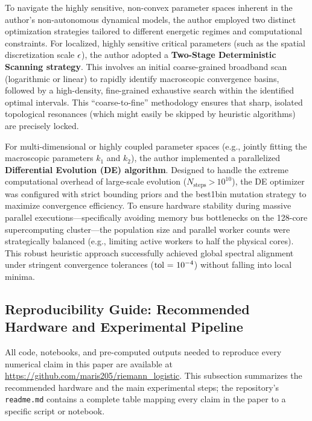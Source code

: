 \documentclass[mca,article,submit,oneauthor,pdftex]{Definitions/mdpi}
\begin{document}
To navigate the highly sensitive, non-convex parameter spaces inherent
in the author's non-autonomous dynamical models, the author employed two distinct
optimization strategies tailored to different energetic regimes and
computational constraints. For localized, highly sensitive critical
parameters (such as the spatial discretization scale \(\text{\ensuremath{\epsilon}}\)), the author
adopted a \textbf{Two-Stage Deterministic Scanning strategy}. This
involves an initial coarse-grained broadband scan (logarithmic or
linear) to rapidly identify macroscopic convergence basins, followed by
a high-density, fine-grained exhaustive search within the identified
optimal intervals. This ``coarse-to-fine'' methodology ensures that
sharp, isolated topological resonances (which might easily be skipped by
heuristic algorithms) are precisely locked.

For multi-dimensional or highly coupled parameter spaces (e.g.,
jointly fitting the macroscopic parameters
\({k}_{\text{1}}\) and \({k}_{\text{2}}\)), the author implemented a
parallelized \textbf{Differential Evolution (DE) algorithm}. Designed to
handle the extreme computational overhead of large-scale evolution
(\({N}_{\text{steps}}~\text{>}~\text{10}^{\text{10}}\)), the DE
optimizer was configured with strict bounding priors and the best1bin
mutation strategy to maximize convergence efficiency. To ensure hardware
stability during massive parallel executions---specifically avoiding
memory bus bottlenecks on the 128-core supercomputing cluster---the
population size and parallel worker counts were strategically balanced
(e.g., limiting active workers to half the physical cores). This robust
heuristic approach successfully achieved global spectral alignment under
stringent convergence tolerances (\(\text{tol~=~}\text{10}^{\text{\ensuremath{-}4}}\))
without falling into local minima.

\subsection{Reproducibility Guide: Recommended Hardware and Experimental Pipeline}\label{sec:repro-guide}

All code, notebooks, and pre-computed outputs needed to reproduce every
numerical claim in this paper are available at
\url{https://github.com/maris205/riemann_logistic}. This subsection summarizes
the recommended hardware and the main experimental steps; the repository's
\texttt{readme.md} contains a complete table mapping every claim in the paper
to a specific script or notebook.
\end{document}
